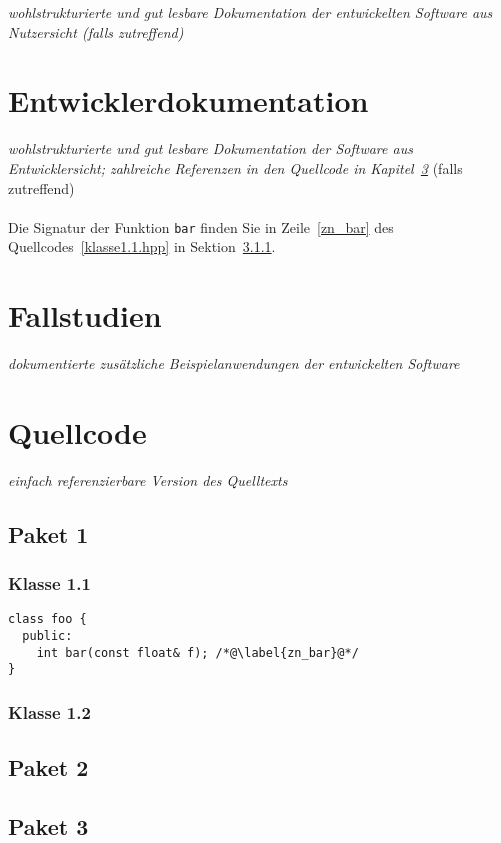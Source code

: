 \documentclass{article}
\newcommand{\refchapter}[1]{Kapitel~\ref{#1}}
\newcommand{\refsec}[1]{Sektion~\ref{#1}}
\begin{document}
{\em wohlstrukturierte und gut lesbare Dokumentation der entwickelten Software aus Nutzersicht (falls zutreffend)}

\section{Entwicklerdokumentation}
\label{app2}

{\em wohlstrukturierte und gut lesbare Dokumentation der Software aus 
Entwicklersicht; zahlreiche Referenzen in den
Quellcode in \refchapter{app4}} (falls zutreffend) \\
\\
Die Signatur der Funktion {\tt bar} finden Sie in Zeile~\ref{zn_bar} des Quellcodes~\ref{klasse1.1.hpp} in \refsec{ssec:6.1.1}.

\section{Fallstudien}
\label{app3}

{\em dokumentierte zus\"atzliche Beispielanwendungen der entwickelten Software}

\section{Quellcode}
\label{app4}

{\em einfach referenzierbare Version des Quelltexts} 

\subsection{Paket 1}
\label{sec:6.1}

\subsubsection{Klasse 1.1}
\label{ssec:6.1.1}

\begin{lstlisting}[caption=Dokumentierter Quellcode in {\tt klasse1.1.hpp},label=klasse1.1.hpp]
class foo {
  public:
    int bar(const float& f); /*@\label{zn_bar}@*/
}
\end{lstlisting}

\subsubsection{Klasse 1.2}

\subsection{Paket 2}

\subsection{Paket 3}
\end{document}
